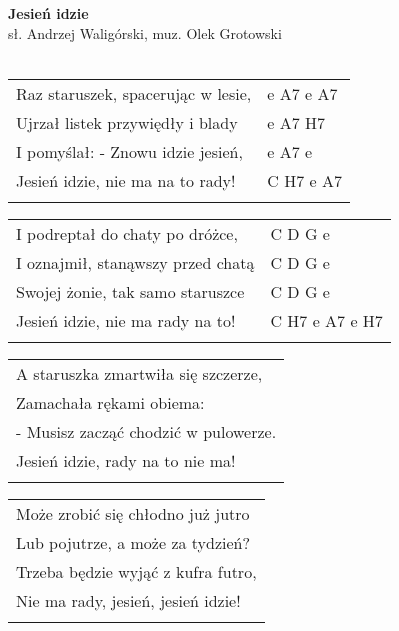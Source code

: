 \documentclass[a5paper]{article}
\begin{document}


\noindent
\fontsize{12pt}{15pt}\selectfont
\textbf{Jesień idzie} \\
\fontsize{8pt}{10pt}\selectfont
sł. Andrzej Waligórski, muz. Olek Grotowski \\ \\
\fontsize{10pt}{12pt}\selectfont
{}
\begin{tabular}{@{}p{7.50cm}p{3cm}@{}}
\noindent
Raz staruszek, spacerując w lesie, & e A7 e A7 \\
Ujrzał listek przywiędły i blady & e A7 H7 \\
I pomyślał: - Znowu idzie jesień, & e A7 e\\
Jesień idzie, nie ma na to rady! & C H7 e A7 \\ \\
\end{tabular} 

\noindent
\begin{tabular}{@{}p{7.50cm}p{3cm}@{}}
I podreptał do chaty po dróżce,	& C D G e \\
I oznajmił, stanąwszy przed chatą & C D G e \\
Swojej żonie, tak samo staruszce & C D G e \\
Jesień idzie, nie ma rady na to! & C H7 e A7 e H7 \\ \\
\end{tabular}

\noindent
\begin{tabular}{@{}p{8.50cm}@{}}
A staruszka zmartwiła się szczerze, \\
Zamachała rękami obiema: \\
- Musisz zacząć chodzić w pulowerze. \\
Jesień idzie, rady na to nie ma! \\ \\
\end{tabular}

\noindent
\begin{tabular}{@{}p{8.50cm}@{}}
Może zrobić się chłodno już jutro \\
Lub pojutrze, a może za tydzień?  \\
Trzeba będzie wyjąć z kufra futro, \\
Nie ma rady, jesień, jesień idzie! \\ \\
\end{tabular}
\end{document}
